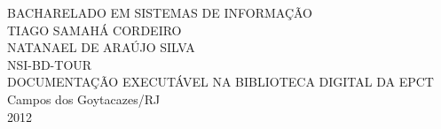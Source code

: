 \begin{titlepage}
 \begin{figure}[ht]
 \centering
 \end{figure}
 \begin{center}
   {\large BACHARELADO EM SISTEMAS DE INFORMAÇÃO} \\ [3.5cm]
   {\large TIAGO SAMAHÁ CORDEIRO} \\
   {\large NATANAEL DE ARAÚJO SILVA} \\ [4cm]
   {\large NSI-BD-TOUR} \\ [0.5cm]
   {\small DOCUMENTAÇÃO EXECUTÁVEL NA BIBLIOTECA DIGITAL DA EPCT} \\
   \vfill
   {\large Campos dos Goytacazes/RJ} \\
   {\large 2012}
 \end{center}
\end{titlepage}